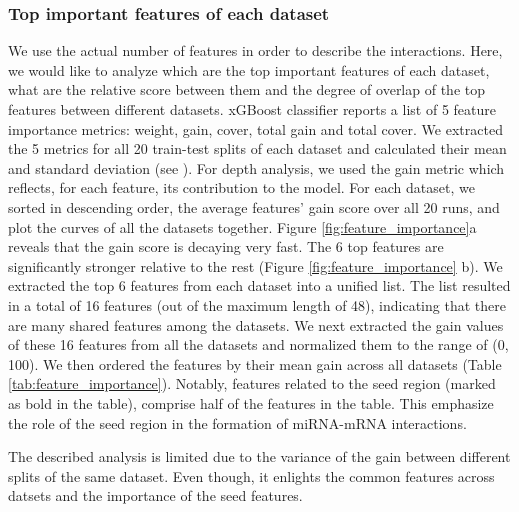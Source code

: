 \documentclass{bmcart}
\begin{document}
\subsubsection*{Top important features of each dataset}
We use the actual number of features in order to describe the interactions. Here, we would like to analyze which are the top important features of each dataset, what are the relative score between them and the degree of overlap of the top features between different datasets. xGBoost classifier reports a list of 5 feature importance metrics: weight, gain, cover, total gain and total cover. We extracted the 5 metrics for all 20 train-test splits of each dataset and calculated their mean and standard deviation (see ).
For depth analysis, we used the gain metric which reflects, for each feature, its contribution to the model. For each dataset, we sorted in descending order, the average features' gain score over all 20 runs, and plot the curves of all the datasets together.
Figure \ref{fig:feature_importance}a reveals that the gain score is decaying very fast. The 6 top features are significantly stronger relative to the rest (Figure \ref{fig:feature_importance} b). We extracted the top 6 features from each dataset into a unified list. The list resulted in a total of 16 features (out of the maximum length of 48),  indicating that there are many shared features among the datasets. We next extracted the gain values of these 16 features from all the datasets and normalized them to the range of (0, 100). We then ordered the features by their mean gain across all datasets (Table \ref{tab:feature_importance}). Notably, features related to the seed region (marked as bold in the table), comprise half of the features in the table. This emphasize the role of the seed region in the formation of miRNA-mRNA interactions. %

The described analysis is limited due to the variance of the gain between different splits of the same dataset. Even though, it enlights the common features across datsets and the importance of the seed features.
\end{document}
